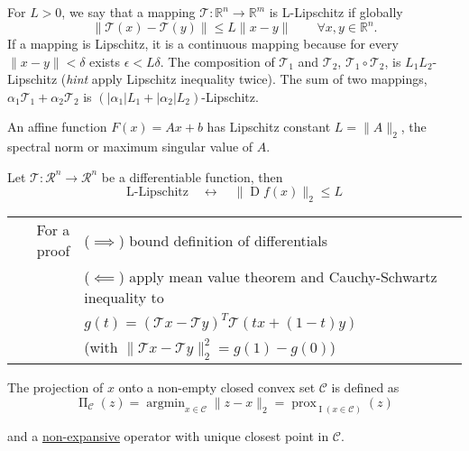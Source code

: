 \documentclass[varwidth=15cm, border=.5cm]{standalone}
\DeclareMathOperator{\prox}{prox}
\DeclareMathOperator*{\argmin}{argmin}
\DeclareMathOperator{\jacobian}{D}
\DeclareMathOperator{\proj}{\Pi}
\DeclareMathOperator{\indicator}{I}
\newcommand*\from{\colon}
\begin{document}
\begin{definition}[label=5nalj3hx, name=Lipschitz Regularity]
	For \( L > 0 \), we say that a mapping \( \mathcal T\from\mathbb R^n\to\mathbb R^m \) is L-Lipschitz if globally
	\[
		\lVert \mathcal T(x) - \mathcal T(y) \rVert \leq L\lVert x - y\rVert \qquad \forall x,y\in\mathbb R^n.
	\]
	If a mapping is Lipschitz, it is a continuous mapping because for every
	\( \lVert x - y \rVert < \delta \) exists \( \epsilon < L \delta \). The composition of \( \mathcal T_1 \) and \( \mathcal T_2 \), 
	\( \mathcal T_1 \circ \mathcal T_2 \), is \( L_1L_2 \)-Lipschitz (\textit{hint} apply Lipschitz inequality twice).
	The sum of two mappings, \( \alpha_1\mathcal T_1 + \alpha_2\mathcal T_2 \) is \((|\alpha_1|L_1 + |\alpha_2|L_2)\)-Lipschitz.

	\begin{example}[label=17vzrkyq, name=Affine Function]
		An affine function \(F(x) = Ax + b\) has Lipschitz constant \(L=\lVert A\rVert_2\), 
		the spectral norm or maximum singular value of \(A\).
	\end{example}

	\begin{example}[label=jydhwyqa, name=Differentiable Function]
		Let \( \mathcal T\from\mathcal R^n\to\mathcal R^n\) be a differentiable function, then 
		\[
			\text{L-Lipschitz} \quad \leftrightarrow \quad \lVert\jacobian f(x)\rVert_2 \leq L
		\]

		\begin{tabular}{rl}
			For a proof & (\( \implies \)) bound definition of differentials \\
				    & (\( \impliedby \)) apply mean value
				    theorem and Cauchy-Schwartz inequality to \\
				    &\quad\(g(t) = (\mathcal Tx - \mathcal Ty)^T\mathcal T(tx + (1-t) y) \)\\
				    &\quad(with \(\lVert\mathcal Tx - \mathcal Ty\rVert^2_2 = g(1) - g(0)\))
		\end{tabular}
	\end{example}

	\begin{example}[label=5pxh2ufj, name=Projections]
		The projection of \(x\) onto a non-empty closed convex set \(
		\mathcal C\) is defined as 
		\[
			\proj_\mathcal{C}(z) = \argmin_{x\in\mathcal C}\lVert z
			-x\rVert_2 = \prox_{\indicator(x\in\mathcal C)}(z)
		\]

		and a \hyperref[2s6tfa1j]{non-expansive} operator with unique
		closest point in \( \mathcal C\).


\end{example}
\end{definition}
\end{document}
